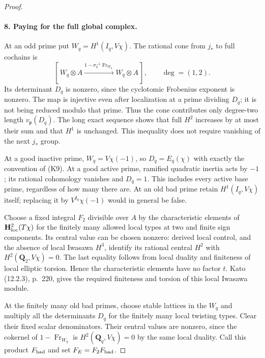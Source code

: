 \documentclass[11pt]{article}
\theoremstyle{definition}
\theoremstyle{remark}
\begin{document}
\begin{proof}
\paragraph{8. Paying for the full global complex.}
At an odd prime put $W_q=H^1(I_q,V\chi)$. The rational cone from
$j_*$ to full cochains is
\[
 [\,W_q\otimes A\xrightarrow{1-\sigma_q^{-1}\operatorname{Fr}_{W_q}}
          W_q\otimes A\,],\qquad\deg=(1,2).              \tag{K16}
\]
Its determinant $D_q$ is nonzero, since the cyclotomic Frobenius
exponent is nonzero. The map is injective even after localization
at a prime dividing $D_q$; it is not being reduced modulo that
prime. Thus the cone contributes only degree-two length
$v_{\mathfrak p}(D_q)$. The long exact sequence shows that full
$H^2$ increases by at most their sum and that $H^1$ is unchanged.
This inequality does not require vanishing of the next $j_*$ group.

At a good inactive prime, $W_q=V\chi(-1)$, so $D_q=E_q(\chi)$
with exactly the convention of (K9). At a good active prime,
ramified quadratic inertia acts by $-1$; its rational cohomology
vanishes and $D_q=1$. This includes every active base prime,
regardless of how many there are. At an old bad prime retain
$H^1(I_q,V\chi)$ itself; replacing it by $V^{I_q}\chi(-1)$
would in general be false.

Choose a fixed integral $F_2$ divisible over $A$ by the
characteristic elements of $\mathbf H^2_{\rm loc}(T\chi)$
for the finitely many allowed local types at two and finite
sign components. Its central value can be chosen nonzero:
derived local control, and the absence of local Iwasawa $H^3$,
identify its rational central $H^2$ with $H^2(\mathbf Q_2,V\chi)=0$.
The last equality follows from local duality and finiteness of
local elliptic torsion. Hence the characteristic elements have
no factor $t$. Kato (12.2.3), p.~220, gives the required finiteness
and torsion of this local Iwasawa module.

At the finitely many old bad primes, choose stable lattices in
the $W_q$ and multiply all the determinants $D_q$ for the finitely
many local twisting types. Clear their fixed scalar denominators.
Their central values are nonzero, since the cokernel of
$1-\operatorname{Fr}_{W_q}$ is $H^2(\mathbf Q_q,V\chi)=0$
by the same local duality. Call this product $F_{\rm bad}$ and set
$F_E=F_2F_{\rm bad}$.


\end{proof}
\end{document}
